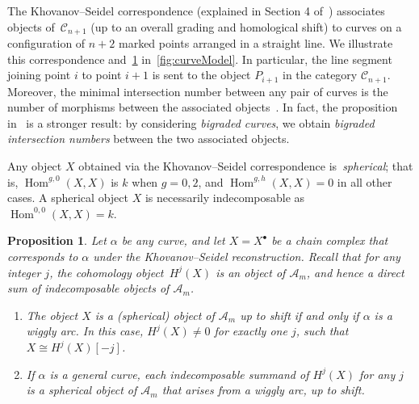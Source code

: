 \documentclass{amsart}
\newtheorem{proposition}[theorem]{Proposition}
\theoremstyle{definition}
\DeclareMathOperator{\Hom}{Hom} %
\newcommand{\darkblue}{\color{darkblue}} %
\newcommand{\defn}[1]{\textsl{\darkblue #1}} %
\begin{document}
The Khovanov--Seidel correspondence (explained in Section 4 of~\cite{kho.sei:02}) associates objects of~\(\mathcal{C}_{n+1}\) (up to an overall grading and homological shift) to curves on a configuration of \(n+2\) marked points arranged in a straight line.
We illustrate this correspondence and~\cref{prop:cohomology-pieces} in~\cref{fig:curveModel}.
In particular, the line segment joining point \(i\) to point \(i+1\) is sent to the object \(P_{i+1}\) in the category \(\mathcal{C}_{n+1}\).
Moreover, the minimal intersection number between any pair of curves is the number of morphisms between the associated objects~\cite[Prop.~4.9]{kho.sei:02}.
In fact, the proposition in~\cite{kho.sei:02} is a stronger result: by considering \emph{bigraded curves}, we obtain \emph{bigraded intersection numbers} between the two associated objects.

Any object \(X\) obtained via the Khovanov--Seidel correspondence is~\defn{spherical}; that is, \(\Hom^{g,0}(X,X)\) is \(k\) when \(g = 0,2\), and \(\Hom^{g,h}(X,X) = 0\) in all other cases.
A spherical object \(X\) is necessarily indecomposable as \(\Hom^{0,0}(X,X) = k\).

\begin{proposition}
\label{prop:cohomology-pieces}
Let \(\alpha\) be any curve, and let \(X = X^{\bullet}\) be a chain complex that corresponds to \(\alpha\) under the Khovanov--Seidel reconstruction.
Recall that for any integer \(j\), the cohomology object~\(H^j(X)\) is an object of \(\mathcal{A}_m\), and hence a direct sum of indecomposable objects of \(\mathcal{A}_m\).
\begin{enumerate}
\item The object \(X\) is a (spherical) object of \(\mathcal{A}_m\) up to shift if and only if \(\alpha\) is a wiggly arc. In this case, \(H^j(X) \neq 0\) for exactly one \(j\), such that \(X \cong H^j(X)[-j]\).
\item If \(\alpha\) is a general curve, each indecomposable summand of \(H^j(X)\) for any \(j\) is a spherical object of \(\mathcal{A}_m\) that arises from a wiggly arc, up to shift.
\end{enumerate}
\end{proposition}
\end{document}

